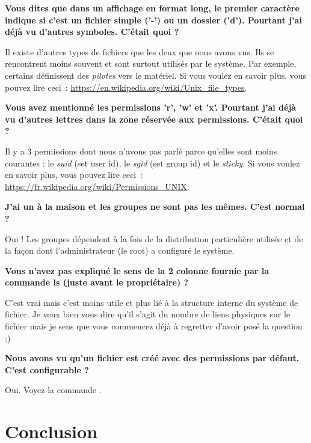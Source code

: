 \documentclass[a4paper,11pt]{style-esi/td}
\begin{document}
		\begin{faq}
			\textbf{%
				Vous dites que dans un affichage en format long, 
				le premier caractère indique si c'est un fichier simple ('-') ou un dossier ('d'). 
				Pourtant j'ai déjà vu d'autres symboles. C'était quoi ?
			}
			
			Il existe d'autres types de fichiers que les deux que nous avons vus. 
			Ils se rencontrent moins souvent et sont surtout utilisés par le système.
			Par exemple, certains définissent des \textit{pilotes} vers le matériel. 
			Si vous voulez en savoir plus, vous pouvez lire ceci~:
			\url{https://en.wikipedia.org/wiki/Unix\_file\_types}.  

			\medskip
			\textbf{%
				Vous avez mentionné les permissions 'r', 'w' et 'x'. 
				Pourtant j'ai déjà vu d'autres lettres dans la zone réservée aux permissions. 
				C'était quoi ?
			}

			Il y a 3 permissions dont nous n'avons pas parlé parce qu'elles sont moins courantes : 
			le \textit{suid} (set user id), le \textit{sgid} (set group id) 
			et le \textit{sticky}. 
			Si vous voulez en savoir plus, vous pouvez lire ceci~:
			\url{https://fr.wikipedia.org/wiki/Permissions\_UNIX}.  

			\medskip
			\textbf{%
				J'ai un  à la maison et les groupes ne sont pas les mêmes. 
				C'est normal ?
			}

			Oui ! 
			Les groupes dépendent à la fois de la distribution particulière utilisée
			et de la façon dont l'administrateur (le root) a configuré le système.   

			\medskip
			\textbf{%
				Vous n'avez pas expliqué le sens de la 2\ieme{} colonne 
				fournie par la commande ls (juste avant le propriétaire) ?
			}

			C'est vrai mais c'est moins utile 
			et plus lié à la structure interne du système de fichier. 
			Je veux bien vous dire qu'il s'agit 
			du nombre de liens physiques sur le fichier 
			mais je sens que vous commencez déjà à regretter d'avoir posé la question ;)  

			\medskip
			\textbf{%
				Nous avons vu qu'un fichier est créé avec des permissions par défaut. 
				C'est configurable ?
			}

			Oui. Voyez la commande .  
		\end{faq}

\section{Conclusion}
\end{document}
